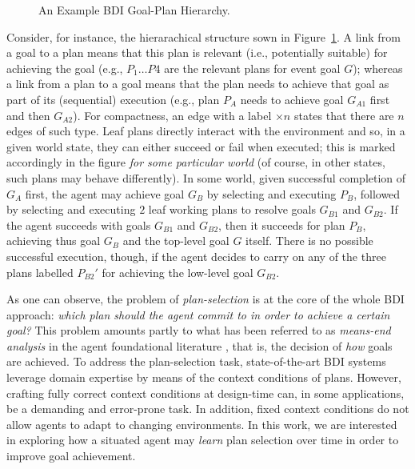 \begin{figure}[t]
\begin{center}

\end{center}
\caption{An Example BDI Goal-Plan Hierarchy.}
\label{fig:T3}
\end{figure}


Consider, for instance, the hierarachical structure sown in Figure~\ref{fig:T3}.
A link from a goal to a plan means that this plan is relevant (i.e., potentially
suitable) for achieving the goal (e.g., $P_1 \ldots P4$ are the relevant plans
for event goal $G$); whereas a link from a plan to a goal means that the plan
needs to achieve that goal as part of its (sequential) execution (e.g., plan
$P_A$ needs to achieve goal $G_{A1}$ first and then $G_{A2}$).
For compactness, an edge with a label $\times n$ states that there are $n$ edges
of such type.
Leaf plans directly interact with the environment and so, in a given world state,
they can either succeed or fail when executed; this is marked accordingly in the
figure \emph{for some particular world} (of course, in other states, such plans
may behave differently).
In some world, given successful completion of $G_A$ first, the agent may achieve
goal $G_B$ by selecting and executing $P_B$, followed by selecting and executing
$2$ leaf working plans to resolve goals $G_{B1}$ and $G_{B2}$. If the agent
succeeds with goals $G_{B1}$ and $G_{B2}$, then it succeeds for plan $P_B$,
achieving thus goal $G_B$ and the top-level goal $G$ itself. There is no possible
successful execution, though, if the agent decides to carry on any of the three
plans labelled $P_{B2}'$ for achieving the low-level goal $G_{B2}$.





As one can observe, the problem of \textit{plan-selection} is at the core
of the whole BDI approach:
\emph{which plan should the agent commit to in order to achieve a certain goal?}
This problem amounts partly to what has been referred to as
\emph{means-end analysis} in the agent foundational literature
\cite{Pollack92-IRMA,Bratman88}, that is, the decision of \textit{how} goals are
achieved.
To address the plan-selection task, state-of-the-art BDI systems leverage domain
expertise by means of the context conditions of plans. However, crafting fully
correct context conditions at design-time can, in some applications, be a
demanding and error-prone task. In addition, fixed context conditions do not
allow agents to adapt to changing environments.
In this work, we are interested in exploring how a situated agent may \emph{learn} plan selection over time in order to improve goal achievement.




